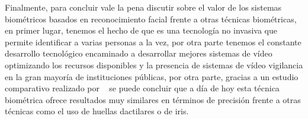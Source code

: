 




Finalmente, para concluir vale la pena discutir sobre el valor de los sistemas biométricos basados en reconocimiento facial frente a otras técnicas biométricas, en primer lugar, tenemos el hecho de que es una tecnología no invasiva que permite identificar a varias personas a la vez, por otra parte tenemos el constante desarrollo tecnológico encaminado a desarrollar mejores sistemas de vídeo optimizando los recursos disponibles y la presencia de sistemas de vídeo vigilancia en la gran mayoría de instituciones públicas, por otra parte, gracias a un estudio comparativo realizado por ~\cite{FacialF} se puede concluir que a día de hoy esta técnica biométrica ofrece resultados muy similares en términos de precisión frente a otras técnicas como el uso de huellas dactilares o de iris.

